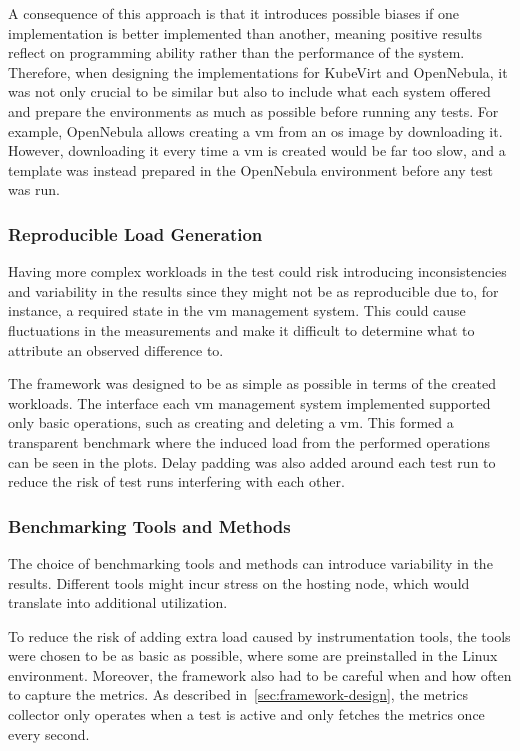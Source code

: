\documentclass{kththesis}
\begin{document}
\begin{enumerate}
A consequence of this approach is that it introduces possible biases if one implementation is better implemented than another, meaning positive results reflect on programming ability rather than the performance of the system. Therefore, when designing the implementations for KubeVirt and OpenNebula, it was not only crucial to be similar but also to include what each system offered and prepare the environments as much as possible before running any tests. For example, OpenNebula allows creating a \Gls{vm} from an \Gls{os} image by downloading it. However, downloading it every time a \Gls{vm} is created would be far too slow, and a template was instead prepared in the OpenNebula environment before any test was run. 

\subsubsection{Reproducible Load Generation}
Having more complex workloads in the test could risk introducing inconsistencies and variability in the results since they might not be as reproducible due to, for instance, a required state in the \Gls{vm} management system. This could cause fluctuations in the measurements and make it difficult to determine what to attribute an observed difference to. 

The framework was designed to be as simple as possible in terms of the created workloads. The interface each \Gls{vm} management system implemented supported only basic operations, such as creating and deleting a \Gls{vm}. This formed a transparent benchmark where the induced load from the performed operations can be seen in the plots. Delay padding was also added around each test run to reduce the risk of test runs interfering with each other.

\subsubsection{Benchmarking Tools and Methods}
The choice of benchmarking tools and methods can introduce variability in the results. Different tools might incur stress on the hosting node, which would translate into additional utilization. 

To reduce the risk of adding extra load caused by instrumentation tools, the tools were chosen to be as basic as possible, where some are preinstalled in the Linux environment. Moreover, the framework also had to be careful when and how often to capture the metrics. As described in\ \ref{sec:framework-design}, the metrics collector only operates when a test is active and only fetches the metrics once every second. 



\end{enumerate}
\end{document}
